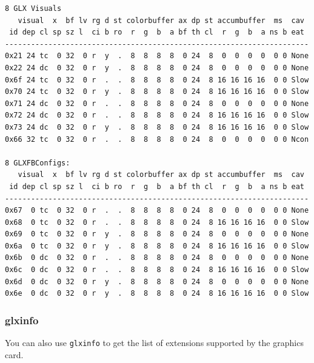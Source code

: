 \begin{verbatim}
8 GLX Visuals
   visual  x  bf lv rg d st colorbuffer ax dp st accumbuffer  ms  cav
 id dep cl sp sz l  ci b ro  r  g  b  a bf th cl  r  g  b  a ns b eat
----------------------------------------------------------------------
0x21 24 tc  0 32  0 r  y  .  8  8  8  8  0 24  8  0  0  0  0  0 0 None
0x22 24 dc  0 32  0 r  y  .  8  8  8  8  0 24  8  0  0  0  0  0 0 None
0x6f 24 tc  0 32  0 r  .  .  8  8  8  8  0 24  8 16 16 16 16  0 0 Slow
0x70 24 tc  0 32  0 r  y  .  8  8  8  8  0 24  8 16 16 16 16  0 0 Slow
0x71 24 dc  0 32  0 r  .  .  8  8  8  8  0 24  8  0  0  0  0  0 0 None
0x72 24 dc  0 32  0 r  .  .  8  8  8  8  0 24  8 16 16 16 16  0 0 Slow
0x73 24 dc  0 32  0 r  y  .  8  8  8  8  0 24  8 16 16 16 16  0 0 Slow
0x66 32 tc  0 32  0 r  .  .  8  8  8  8  0 24  8  0  0  0  0  0 0 Ncon

8 GLXFBConfigs:
   visual  x  bf lv rg d st colorbuffer ax dp st accumbuffer  ms  cav
 id dep cl sp sz l  ci b ro  r  g  b  a bf th cl  r  g  b  a ns b eat
----------------------------------------------------------------------
0x67  0 tc  0 32  0 r  .  .  8  8  8  8  0 24  8  0  0  0  0  0 0 None
0x68  0 tc  0 32  0 r  .  .  8  8  8  8  0 24  8 16 16 16 16  0 0 Slow
0x69  0 tc  0 32  0 r  y  .  8  8  8  8  0 24  8  0  0  0  0  0 0 None
0x6a  0 tc  0 32  0 r  y  .  8  8  8  8  0 24  8 16 16 16 16  0 0 Slow
0x6b  0 dc  0 32  0 r  .  .  8  8  8  8  0 24  8  0  0  0  0  0 0 None
0x6c  0 dc  0 32  0 r  .  .  8  8  8  8  0 24  8 16 16 16 16  0 0 Slow
0x6d  0 dc  0 32  0 r  y  .  8  8  8  8  0 24  8  0  0  0  0  0 0 None
0x6e  0 dc  0 32  0 r  y  .  8  8  8  8  0 24  8 16 16 16 16  0 0 Slow
\end{verbatim}

\subsubsection{glxinfo}
\label{sec:glxinfo}

You can also use \verb!glxinfo! to get the list of extensions
supported by the graphics card.

